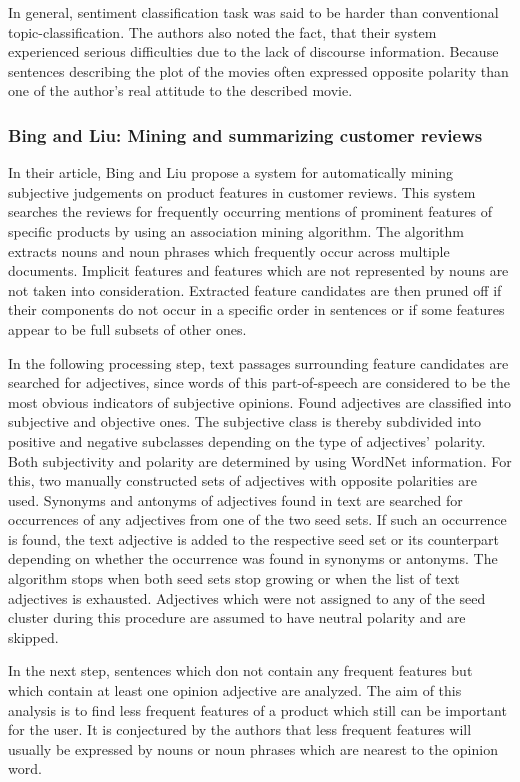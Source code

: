 \documentclass[a4paper,11pt]{article}
\begin{document}
In general, sentiment classification task was said to be harder than
conventional topic-classification.  The authors also noted the fact, that
their system experienced serious difficulties due to the lack of discourse
information.  Because sentences describing the plot of the movies often
expressed opposite polarity than one of the author's real attitude to the
described movie.

\subsubsection{Bing and Liu: Mining and summarizing customer reviews\cite{Bing-Liu-04}}
In their article, Bing and Liu \cite{Bing-Liu-04} propose a system for
automatically mining subjective judgements on product features in customer
reviews.  This system searches the reviews for frequently occurring mentions
of prominent features of specific products by using an association mining
algorithm.  The algorithm extracts nouns and noun phrases which frequently
occur across multiple documents.  Implicit features and features which are not
represented by nouns are not taken into consideration.  Extracted feature
candidates are then pruned off if their components do not occur in a specific
order in sentences or if some features appear to be full subsets of other
ones.

In the following processing step, text passages surrounding feature candidates
are searched for adjectives, since words of this part-of-speech are considered
to be the most obvious indicators of subjective opinions.  Found adjectives
are classified into subjective and objective ones.  The subjective class is
thereby subdivided into positive and negative subclasses depending on the type
of adjectives' polarity.  Both subjectivity and polarity are determined by
using WordNet information.  For this, two manually constructed sets of
adjectives with opposite polarities are used.  Synonyms and antonyms of
adjectives found in text are searched for occurrences of any adjectives from
one of the two seed sets.  If such an occurrence is found, the text adjective
is added to the respective seed set or its counterpart depending on whether
the occurrence was found in synonyms or antonyms.  The algorithm stops when
both seed sets stop growing or when the list of text adjectives is exhausted.
Adjectives which were not assigned to any of the seed cluster during this
procedure are assumed to have neutral polarity and are skipped.

In the next step, sentences which don not contain any frequent features but
which contain at least one opinion adjective are analyzed.  The aim of this
analysis is to find less frequent features of a product which still can be
important for the user.  It is conjectured by the authors that less frequent
features will usually be expressed by nouns or noun phrases which are nearest
to the opinion word.
\end{document}
